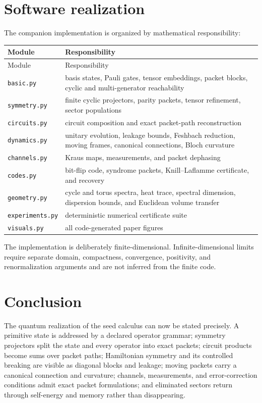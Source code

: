 \documentclass[11pt]{article}
\theoremstyle{definition}
\theoremstyle{remark}
\begin{document}
\section{Software realization}

The companion implementation is organized by mathematical responsibility:

\begin{longtable}{L{0.28\textwidth}L{0.64\textwidth}}
\toprule
Module & Responsibility\\
\midrule
\endfirsthead
\toprule
Module & Responsibility\\
\midrule
\endhead
\texttt{basic.py} & basis states, Pauli gates, tensor embeddings, packet blocks, cyclic and multi-generator reachability\\
\texttt{symmetry.py} & finite cyclic projectors, parity packets, tensor refinement, sector populations\\
\texttt{circuits.py} & circuit composition and exact packet-path reconstruction\\
\texttt{dynamics.py} & unitary evolution, leakage bounds, Feshbach reduction, moving frames, canonical connections, Bloch curvature\\
\texttt{channels.py} & Kraus maps, measurements, and packet dephasing\\
\texttt{codes.py} & bit-flip code, syndrome packets, Knill--Laflamme certificate, and recovery\\
\texttt{geometry.py} & cycle and torus spectra, heat trace, spectral dimension, dispersion bounds, and Euclidean volume transfer\\
\texttt{experiments.py} & deterministic numerical certificate suite\\
\texttt{visuals.py} & all code-generated paper figures\\
\bottomrule
\end{longtable}

The implementation is deliberately finite-dimensional. Infinite-dimensional limits require separate domain, compactness, convergence, positivity, and renormalization arguments and are not inferred from the finite code.

\section{Conclusion}

The quantum realization of the seed calculus can now be stated precisely. A primitive state is addressed by a declared operator grammar; symmetry projectors split the state and every operator into exact packets; circuit products become sums over packet paths; Hamiltonian symmetry and its controlled breaking are visible as diagonal blocks and leakage; moving packets carry a canonical connection and curvature; channels, measurements, and error-correction conditions admit exact packet formulations; and eliminated sectors return through self-energy and memory rather than disappearing.
\end{document}
